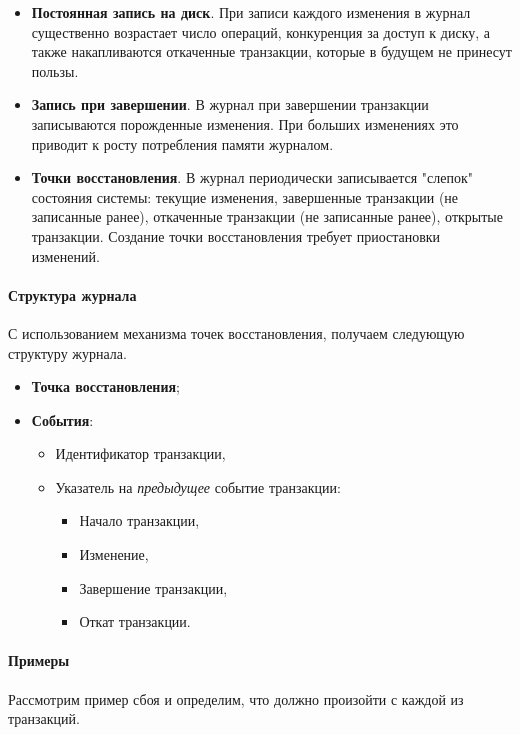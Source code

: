 \begin{itemize}
    \item \textbf{Постоянная запись на диск}. При записи каждого изменения в
        журнал существенно возрастает число операций, конкуренция за доступ к
        диску, а также накапливаются откаченные транзакции, которые в будущем
        не принесут пользы.
    \item \textbf{Запись при завершении}. В журнал при завершении транзакции
        записываются порожденные изменения. При больших изменениях это приводит
        к росту потребления памяти журналом.
    \item \textbf{Точки восстановления}. В журнал периодически записывается
        "слепок" состояния системы: текущие изменения, завершенные транзакции
        (не записанные ранее), откаченные транзакции (не записанные ранее),
        открытые транзакции. Создание точки восстановления требует приостановки
        изменений.
\end{itemize}

\paragraph{Структура журнала}

С использованием механизма точек восстановления, получаем следующую структуру
журнала.

\begin{itemize}
    \item \textbf{Точка восстановления};
    \item \textbf{События}:
        \begin{itemize}
            \item Идентификатор транзакции,
            \item Указатель на \textit{предыдущее} событие транзакции:
                \begin{itemize}
                    \item Начало транзакции,
                    \item Изменение,
                    \item Завершение транзакции,
                    \item Откат транзакции.
                \end{itemize}
        \end{itemize}
\end{itemize}

\paragraph{Примеры}
Рассмотрим пример сбоя и определим, что должно произойти с каждой из транзакций.

